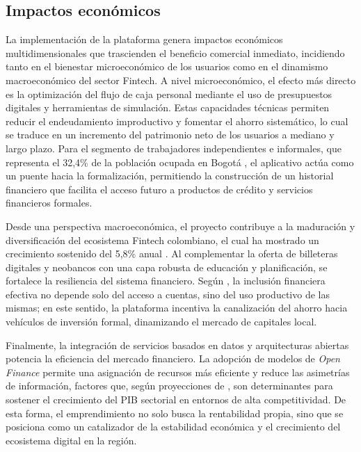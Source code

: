 {}
\subsection*{Impactos económicos}


La implementación de la plataforma genera impactos económicos multidimensionales que trascienden el beneficio comercial inmediato, incidiendo tanto en el bienestar microeconómico de los usuarios como en el dinamismo macroeconómico del sector Fintech. A nivel microeconómico, el efecto más directo es la optimización del flujo de caja personal mediante el uso de presupuestos digitales y herramientas de simulación. Estas capacidades técnicas permiten reducir el endeudamiento improductivo y fomentar el ahorro sistemático, lo cual se traduce en un incremento del patrimonio neto de los usuarios a mediano y largo plazo. Para el segmento de trabajadores independientes e informales, que representa el 32,4\% de la población ocupada en Bogotá \parencite{DANE01}, el aplicativo actúa como un puente hacia la formalización, permitiendo la construcción de un historial financiero que facilita el acceso futuro a productos de crédito y servicios financieros formales.

Desde una perspectiva macroeconómica, el proyecto contribuye a la maduración y diversificación del ecosistema Fintech colombiano, el cual ha mostrado un crecimiento sostenido del 5,8\% anual \parencite{RevistaCIES01}. Al complementar la oferta de billeteras digitales y neobancos con una capa robusta de educación y planificación, se fortalece la resiliencia del sistema financiero. Según \textcite{BancadeOportunidades01}, la inclusión financiera efectiva no depende solo del acceso a cuentas, sino del uso productivo de las mismas; en este sentido, la plataforma incentiva la canalización del ahorro hacia vehículos de inversión formal, dinamizando el mercado de capitales local.

Finalmente, la integración de servicios basados en datos y arquitecturas abiertas potencia la eficiencia del mercado financiero. La adopción de modelos de \textit{Open Finance} permite una asignación de recursos más eficiente y reduce las asimetrías de información, factores que, según proyecciones de \textcite{Asobancaria01}, son determinantes para sostener el crecimiento del PIB sectorial en entornos de alta competitividad. De esta forma, el emprendimiento no solo busca la rentabilidad propia, sino que se posiciona como un catalizador de la estabilidad económica y el crecimiento del ecosistema digital en la región.